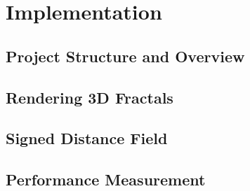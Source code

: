 \chapter{Implementation}
\label{chapter3}

\section{Project Structure and Overview}
\lipsum[1-1] \cite{aron2009mandelbulb}

\section{Rendering 3D Fractals}

\section{Signed Distance Field}

\section{Performance Measurement}